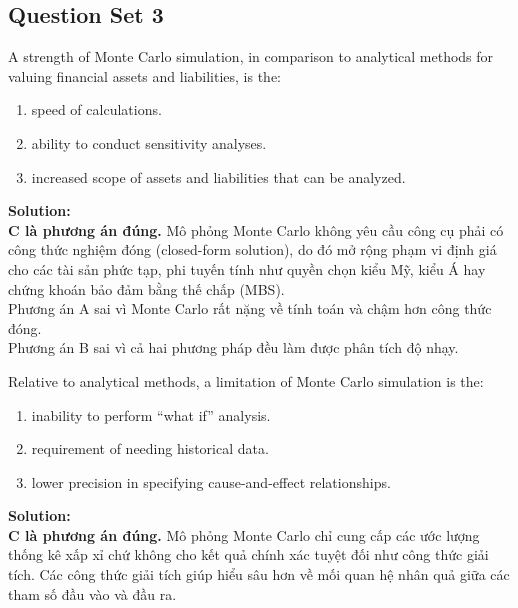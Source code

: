 \subsection{Question Set 3}
\label{subsec:app_mod9_Question_Set_3}

\begin{tcolorbox}[
	colback=gray!5!white,
	colframe=black!15!white,
	boxrule=0.5pt,
	arc=3pt,
	title=\textbf{Question 1},
	coltitle=black,
	colbacktitle=black!5!white,
	before skip=6pt,
	after skip=6pt,
	breakable
]
A strength of Monte Carlo simulation, in comparison to analytical methods for valuing financial assets and liabilities, is the:
\begin{enumerate}[label=\Alph*.]
	\item speed of calculations.
	\item ability to conduct sensitivity analyses.
	\item increased scope of assets and liabilities that can be analyzed.
\end{enumerate}

\textbf{Solution:} \\
\textbf{C là phương án đúng.} Mô phỏng Monte Carlo không yêu cầu công cụ phải có công thức nghiệm đóng (closed-form solution), do đó mở rộng phạm vi định giá cho các tài sản phức tạp, phi tuyến tính như quyền chọn kiểu Mỹ, kiểu Á hay chứng khoán bảo đảm bằng thế chấp (MBS). \\
Phương án A sai vì Monte Carlo rất nặng về tính toán và chậm hơn công thức đóng. \\
Phương án B sai vì cả hai phương pháp đều làm được phân tích độ nhạy.
\end{tcolorbox}

\begin{tcolorbox}[
	colback=gray!5!white,
	colframe=black!15!white,
	boxrule=0.5pt,
	arc=3pt,
	title=\textbf{Question 2},
	coltitle=black,
	colbacktitle=black!5!white,
	before skip=6pt,
	after skip=6pt,
	breakable
]
Relative to analytical methods, a limitation of Monte Carlo simulation is the:
\begin{enumerate}[label=\Alph*.]
	\item inability to perform ``what if'' analysis.
	\item requirement of needing historical data.
	\item lower precision in specifying cause-and-effect relationships.
\end{enumerate}

\textbf{Solution:} \\
\textbf{C là phương án đúng.} Mô phỏng Monte Carlo chỉ cung cấp các ước lượng thống kê xấp xỉ chứ không cho kết quả chính xác tuyệt đối như công thức giải tích. Các công thức giải tích giúp hiểu sâu hơn về mối quan hệ nhân quả giữa các tham số đầu vào và đầu ra.
\end{tcolorbox}

